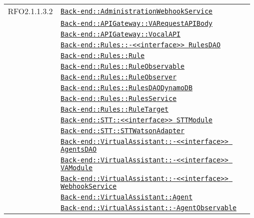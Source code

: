 \begin{longtable}{|>{\centering}m{3cm}|m{10cm}<{\centering}|}
RFO2.1.1.3.2 & \hyperref[Back-end::AdministrationWebhookService]{\texttt{Back-end::AdministrationWebhookService}}\\
& \hyperref[Back-end::APIGateway::VARequestAPIBody]{\texttt{Back-end::APIGateway::VARequestAPIBody}}\\
& \hyperref[Back-end::APIGateway::VocalAPI]{\texttt{Back-end::APIGateway::VocalAPI}}\\
& \hyperref[Back-end::Rules::<<interface>> RulesDAO]{\texttt{Back-end::Rules::-\linebreak <<interface>> RulesDAO}}\\
& \hyperref[Back-end::Rules::Rule]{\texttt{Back-end::Rules::Rule}}\\
& \hyperref[Back-end::Rules::RuleObservable]{\texttt{Back-end::Rules::RuleObservable}}\\
& \hyperref[Back-end::Rules::RuleObserver]{\texttt{Back-end::Rules::RuleObserver}}\\
& \hyperref[Back-end::Rules::RulesDAODynamoDB]{\texttt{Back-end::Rules::RulesDAODynamoDB}}\\
& \hyperref[Back-end::Rules::RulesService]{\texttt{Back-end::Rules::RulesService}}\\
& \hyperref[Back-end::Rules::RuleTarget]{\texttt{Back-end::Rules::RuleTarget}}\\
& \hyperref[Back-end::STT::<<interface>> STTModule]{\texttt{Back-end::STT::<<interface>> STTModule}}\\
& \hyperref[Back-end::STT::STTWatsonAdapter]{\texttt{Back-end::STT::STTWatsonAdapter}}\\
& \hyperref[Back-end::VirtualAssistant::<<interface>> AgentsDAO]{\texttt{Back-end::VirtualAssistant::-\linebreak <<interface>> AgentsDAO}}\\
& \hyperref[Back-end::VirtualAssistant::<<interface>> VAModule]{\texttt{Back-end::VirtualAssistant::-\linebreak <<interface>> VAModule}}\\
& \hyperref[Back-end::VirtualAssistant::<<interface>> WebhookService]{\texttt{Back-end::VirtualAssistant::-\linebreak <<interface>> WebhookService}}\\
& \hyperref[Back-end::VirtualAssistant::Agent]{\texttt{Back-end::VirtualAssistant::Agent}}\\
& \hyperref[Back-end::VirtualAssistant::AgentObservable]{\texttt{Back-end::VirtualAssistant::-\linebreak AgentObservable}}\\

\end{longtable}
